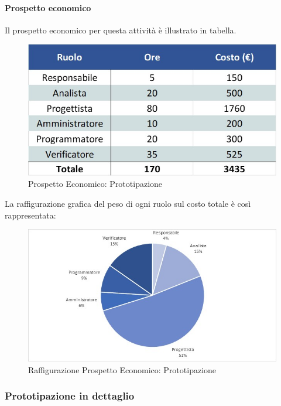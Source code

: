 \paragraph{Prospetto economico}
Il prospetto economico per questa attività è illustrato in tabella. 
\begin{figure}[h!]
	\centerline{\includegraphics[scale=0.4]{img/Preventivo/Prototipazione.Economico.jpg}}
	\caption{Prospetto Economico: Prototipazione}
\end{figure}
La raffigurazione grafica del peso di ogni ruolo sul costo totale è così rappresentata: 
\begin{figure}[h!]
	\centerline{\includegraphics[scale=0.4]{img/Preventivo/Torte/Prototipazione.jpg}}
	\caption{Raffigurazione Prospetto Economico: Prototipazione}
\end{figure}

\subsubsection{Prototipazione in dettaglio}
